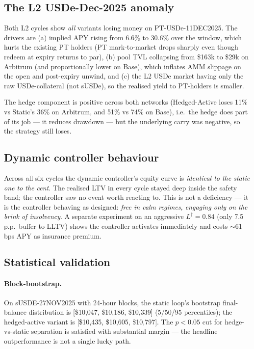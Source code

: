 \documentclass[11pt,a4paper]{article}
\begin{document}
\subsection{The L2 USDe-Dec-2025 anomaly}
\label{sec:l2-anomaly}

Both L2 cycles show \emph{all} variants losing money on
PT-USDe-11DEC2025. The drivers are
(a) implied APY rising from 6.6\% to 30.6\% over the window, which
hurts the existing PT holders (PT mark-to-market drops sharply
even though redeem at expiry returns to par),
(b) pool TVL collapsing from \$163k to \$29k on Arbitrum (and
proportionally lower on Base), which inflates AMM slippage on
the open and post-expiry unwind, and
(c) the L2 USDe market having only the raw USDe-collateral (not
sUSDe), so the realised yield to PT-holders is smaller.

The hedge component is positive across both networks (Hedged-Active
loses 11\% vs Static's 36\% on Arbitrum, and 51\% vs 74\% on Base),
i.e.\ the hedge does part of its job — it reduces drawdown — but
the underlying carry was negative, so the strategy still loses.

\subsection{Dynamic controller behaviour}

Across all six cycles the dynamic controller's equity curve is
\emph{identical to the static one to the cent}. The realised LTV
in every cycle stayed deep inside the safety band; the controller
saw no event worth reacting to. This is not a deficiency — it is
the controller behaving as designed: \emph{free in calm regimes,
engaging only on the brink of insolvency}. A separate experiment
on an aggressive \(L^\dagger=0.84\) (only 7.5 p.p.\ buffer to LLTV)
shows the controller activates immediately and costs
\(\sim\)61 bps APY as insurance premium.

\subsection{Statistical validation}

\paragraph{Block-bootstrap.} On sUSDE-27NOV2025 with 24-hour
blocks, the static loop's bootstrap final-balance distribution is
[\$10{,}047, \$10{,}186, \$10{,}339] (5/50/95 percentiles); the
hedged-active variant is [\$10{,}435, \$10{,}605, \$10{,}797]. The
\(p<0.05\) cut for hedge-vs-static separation is satisfied with
substantial margin — the headline outperformance is not a single
lucky path.
\end{document}

